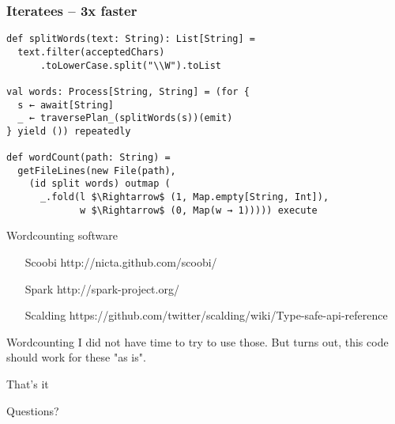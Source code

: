 \documentclass{beamer}
\begin{document}
\begin{frame}[fragile]
\frametitle{Iteratees -- 3x faster}
\begin{lstlisting}[mathescape]
def splitWords(text: String): List[String] =
  text.filter(acceptedChars)
      .toLowerCase.split("\\W").toList

val words: Process[String, String] = (for {
  s ← await[String]
  _ ← traversePlan_(splitWords(s))(emit)
} yield ()) repeatedly

def wordCount(path: String) =
  getFileLines(new File(path),
    (id split words) outmap (
      _.fold(l $\Rightarrow$ (1, Map.empty[String, Int]),
             w $\Rightarrow$ (0, Map(w → 1))))) execute
\end{lstlisting}
\end{frame}

\begin{frame}{Wordcounting software}
\begin{enumerate}
  \item[Scoobi] http://nicta.github.com/scoobi/
  \item[Spark] http://spark-project.org/
  \item[Scalding] https://github.com/twitter/scalding/wiki/Type-safe-api-reference
\end{enumerate}
\end{frame}

\begin{frame}{Wordcounting}
  I did not have time to try to use those.
  But turns out, this code should work for these "as is".
\end{frame}

\begin{frame}{That's it}
  \Huge \centerline{Questions?}
\end{frame}
\end{document}
